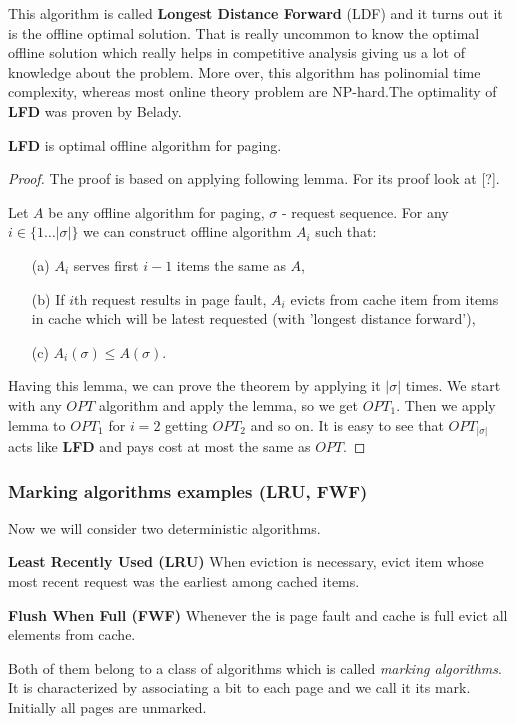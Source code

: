 This algorithm is called \textbf{Longest Distance Forward} (LDF) and it turns 
out it is the offline optimal solution. That is really uncommon to know the 
optimal offline solution which really helps in competitive analysis giving us 
a lot of knowledge about the problem. More over, this algorithm has polinomial 
time complexity, whereas most online theory problem are NP-hard.The optimality 
of \textbf{LFD} was proven by Belady.
\begin{theorem}
 \textbf{LFD} is optimal offline algorithm for paging.
\end{theorem}
\begin{proof}
 The proof is based on applying following lemma. For its proof look at [?].
\begin{lemma}
Let $A$ be any offline algorithm for paging, $\sigma$ - request sequence. For 
any $i \in \{1 \ldots |\sigma|\}$ we can construct offline algorithm $A_i$ such 
that:
\begin{itemize}
 \item[(a)] $A_i$ serves first $i-1$ items the same as $A$,
 \item[(b)] If $i$th request results in page fault, $A_i$ evicts from cache 
item from items in cache which will be latest requested (with 'longest distance 
forward'),
  \item[(c)] $A_i(\sigma) \leq A(\sigma)$.
\end{itemize}
\end{lemma}
Having this lemma, we can prove the theorem by applying it $|\sigma|$ times. 
We start with any $OPT$ algorithm and apply the lemma, so we get $OPT_1$. Then 
we apply lemma to $OPT_1$ for $i=2$ getting $OPT_2$ and so on. It is easy to 
see that $OPT_{|\sigma|}$ acts like \textbf{LFD} and pays cost at most the 
same 
as $OPT$.
\end{proof}

\subsubsection{Marking algorithms examples (LRU, FWF)}
Now we will consider two deterministic algorithms.
\begin{myalgo}
 \textbf{Least Recently Used (LRU)}
 \newline
When eviction is necessary, evict item whose most recent request was the 
earliest among cached items.
\end{myalgo}
\begin{myalgo}
  \textbf{Flush When Full (FWF)}
  \newline
Whenever the is page fault and cache is full evict all elements from cache.
\end{myalgo}
Both of them belong to a class of algorithms which is called \textit{marking 
algorithms}. It is characterized by associating a bit to each page and we call 
it its mark. Initially all pages are unmarked. 

